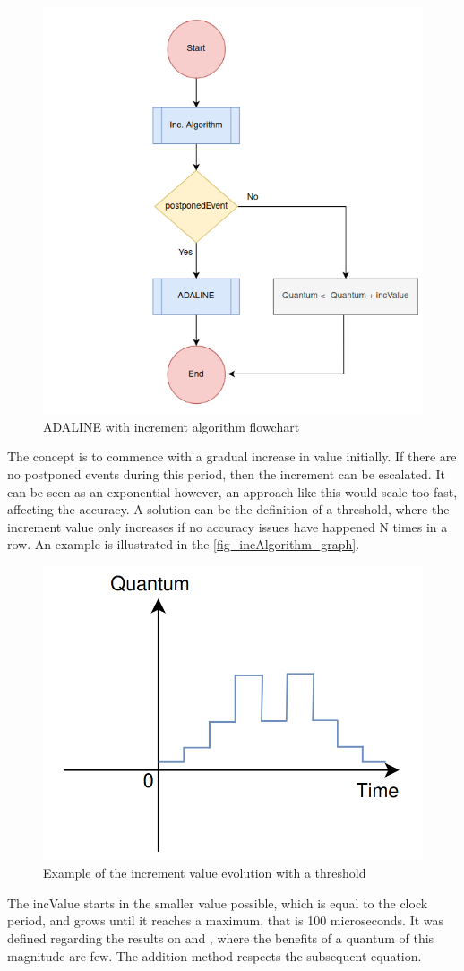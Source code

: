 \begin{figure}[H]
	\centering
 	\includegraphics[width=0.5\linewidth]{Images/ADALINE_v2.png}
 	\caption{ADALINE with increment algorithm flowchart}
	 \label{fig_ADALINE_v2}
\end{figure}

The concept is to commence with a gradual increase in value initially. If there are no postponed events during this period, then the increment 
can be escalated. It can be seen as an exponential however, an approach like this would scale too fast, affecting the accuracy. A solution can be 
the definition of a threshold, where the increment value only increases if no accuracy issues have happened N times in a row. An example is 
illustrated in the \autoref{fig_incAlgorithm_graph}. 

\begin{figure}[h!]
	\centering
 	\includegraphics[width=0.5\linewidth]{Images/incAlgorithm_graph.png}
 	\caption{Example of the increment value evolution with a threshold}
	 \label{fig_incAlgorithm_graph}
\end{figure}

The incValue starts in the smaller value possible, which is equal to the clock period, and grows until it reaches a maximum, that is 100 
microseconds. It was defined regarding the results on \cite{pargem5} and \cite{BeyondQuantumTDSim}, where the benefits of a quantum of this 
magnitude are few. The addition method respects the subsequent equation.

